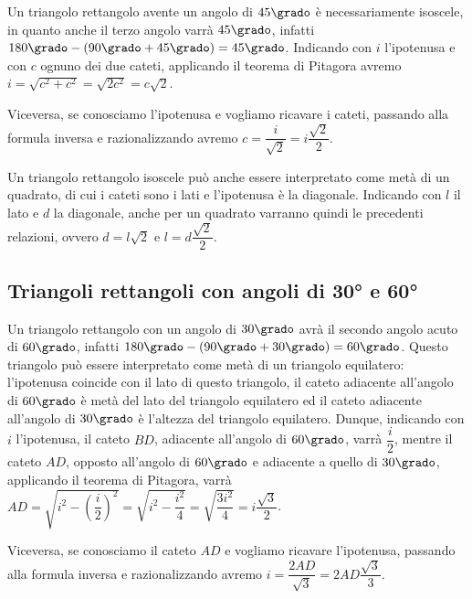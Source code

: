 \begin{wrapfigure}{r}{0.20\textwidth}
  \centering
\end{wrapfigure}
Un triangolo rettangolo avente un angolo di $45\grado$ è 
necessariamente isoscele, in quanto anche il terzo angolo varrà 
$45\grado$, infatti $180\grado - (90\grado+45\grado)=45\grado$.
Indicando con $i$ l'ipotenusa e con $c$ ognuno dei due cateti, 
applicando il teorema di Pitagora avremo 
$i=\sqrt{c^2+c^2}=\sqrt{2c^2}=c\sqrt{2}$.

Viceversa, se conosciamo l'ipotenusa e vogliamo ricavare i cateti, 
passando alla formula inversa e razionalizzando avremo 
$c=\dfrac{i}{\sqrt{2}}=i\dfrac{\sqrt{2}}{2}$.

Un triangolo rettangolo isoscele può anche essere interpretato come 
metà di un quadrato, di cui i cateti sono i lati e l'ipotenusa è la 
diagonale.
Indicando con $l$ il lato e $d$ la diagonale, anche per un quadrato 
varranno quindi le precedenti relazioni, ovvero $d=l\sqrt{2}$ e 
$l=d\dfrac{\sqrt{2}}{2}$.

\newpage %

\subsection{Triangoli rettangoli con angoli di 30° e 60°}

\begin{wrapfigure}{r}{0.25\textwidth}
  \centering
\end{wrapfigure}
Un triangolo rettangolo con un angolo di $30\grado$ avrà il secondo 
angolo acuto di $60\grado$, infatti $180\grado- 
(90\grado+30\grado)=60\grado$. Questo triangolo può essere 
interpretato come metà di un triangolo equilatero: l'ipotenusa 
coincide con il lato di questo triangolo, il cateto adiacente 
all'angolo di $60\grado$ è metà del lato del triangolo equilatero ed 
il cateto adiacente all'angolo di $30\grado$ è l'altezza del 
triangolo equilatero.
Dunque, indicando con $i$ l'ipotenusa, il cateto $BD$, adiacente 
all'angolo di $60\grado$, varrà $\dfrac{i}{2}$, mentre il cateto 
$AD$, opposto all'angolo di $60\grado$ e adiacente a quello di 
$30\grado$, applicando il teorema di Pitagora, varrà 
$AD=\sqrt{i^2-\left(\dfrac{i}{2}\right)^2}=\sqrt{i^2-\dfrac{i^2}{4}}
=\sqrt{\dfrac{3i^2}{4}}=i\dfrac{\sqrt{3}}{2}$.

Viceversa, se conosciamo il cateto $AD$ e vogliamo ricavare 
l'ipotenusa, passando alla formula inversa e razionalizzando avremo 
$i=\dfrac{2AD}{\sqrt{3}}=2AD\dfrac{\sqrt{3}}{3}$.

